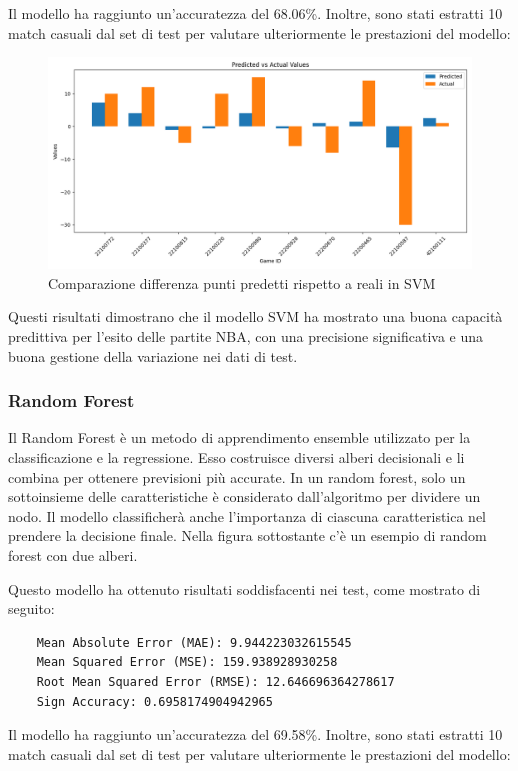 \documentclass[a4paper]{article}
\numberwithin{equation}{section}
\begin{document}
Il modello ha raggiunto un'accuratezza del 68.06\%. Inoltre, sono stati estratti 10 match casuali dal set di test per valutare ulteriormente le prestazioni del modello:

\begin{figure}[H]
    \centering
    \includegraphics[width=0.7\linewidth]{img/svm.png}
    \caption{Comparazione differenza punti predetti rispetto a reali in SVM}
    \label{fig:enter-label}
\end{figure}

Questi risultati dimostrano che il modello SVM ha mostrato una buona capacità predittiva per l'esito delle partite NBA, con una precisione significativa e una buona gestione della variazione nei dati di test.

\subsubsection{Random Forest}

Il Random Forest è un metodo di apprendimento ensemble utilizzato per la classificazione e la regressione. Esso costruisce diversi alberi decisionali e li combina per ottenere previsioni più accurate. In un random forest, solo un sottoinsieme delle caratteristiche è considerato dall'algoritmo per dividere un nodo. Il modello classificherà anche l'importanza di ciascuna caratteristica nel prendere la decisione finale. Nella figura sottostante c'è un esempio di random forest con due alberi.

Questo modello ha ottenuto risultati soddisfacenti nei test, come mostrato di seguito:

\begin{lstlisting}
    Mean Absolute Error (MAE): 9.944223032615545
    Mean Squared Error (MSE): 159.938928930258
    Root Mean Squared Error (RMSE): 12.646696364278617
    Sign Accuracy: 0.6958174904942965
\end{lstlisting}

Il modello ha raggiunto un'accuratezza del 69.58\%. Inoltre, sono stati estratti 10 match casuali dal set di test per valutare ulteriormente le prestazioni del modello:
\end{document}
